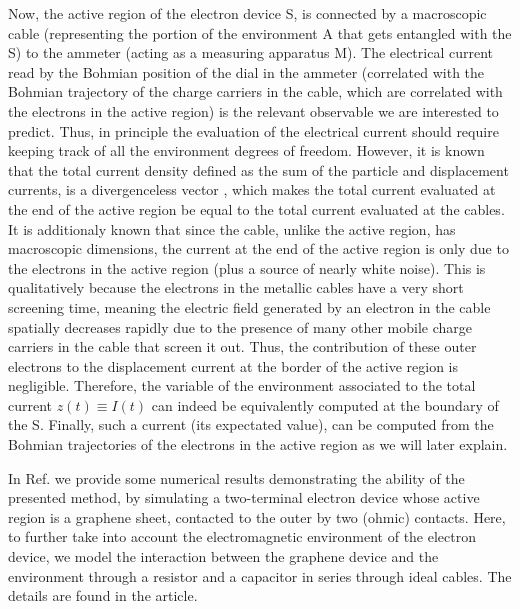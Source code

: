 \documentclass[11pt, a4paper]{article} %
\begin{document}
Now, the active region of the electron device S, is connected by a macroscopic cable (representing the portion of the environment A that gets entangled with the S) to the ammeter (acting as a measuring apparatus M). The electrical current read by the Bohmian position of the dial in the ammeter (correlated with the Bohmian trajectory of the charge carriers in the cable, which are correlated with the electrons in the active region) is the relevant observable we are interested to predict. Thus, in principle the evaluation of the electrical current should require keeping track of all the environment degrees of freedom. However, it is known that the total current density defined as the sum of the particle and displacement currents, is a divergenceless vector \cite{divergenceless}, which makes the total current evaluated at the end of the active region be equal to the total current evaluated at the cables. It is additionaly known \cite{equiv} that since the cable, unlike the active region, has macroscopic dimensions, the current at the end of the active region is only due to the electrons in the active region (plus a source of nearly white noise). This is qualitatively because the electrons in the metallic cables have a very short screening time, meaning the electric field generated by an electron in the cable spatially decreases rapidly due to the presence of many other mobile charge carriers in the cable that screen it out. Thus, the contribution of these outer electrons to the displacement current at the border of the active region is negligible. Therefore, the variable of the environment associated to the total current $z(t)\equiv I(t)$ can indeed be equivalently computed at the boundary of the S. Finally, such a current (its expectated value), can be computed from the Bohmian trajectories of the electrons in the active region as we will later explain. 

In Ref. \cite{Thz} we provide some numerical results demonstrating the ability of the presented method, by simulating a two-terminal electron device whose active region is a graphene sheet, contacted to the outer by two (ohmic) contacts. Here, to further take into account the electromagnetic environment of the electron device, we model the interaction between the graphene device and the environment through a resistor and a capacitor in series through ideal cables. The details are found in the article. 
\end{document}

